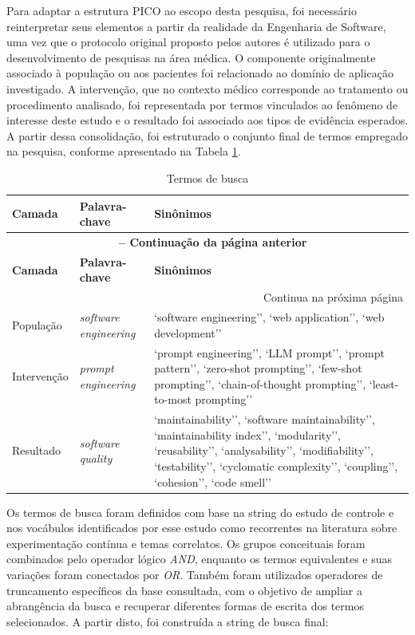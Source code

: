 Para adaptar a estrutura PICO ao escopo desta pesquisa, foi necessário reinterpretar seus elementos a partir da realidade da Engenharia de Software, uma vez que o protocolo original proposto pelos autores é utilizado para o desenvolvimento de pesquisas na área médica. O componente originalmente associado à população ou aos pacientes foi relacionado ao domínio de aplicação investigado. A intervenção, que no contexto médico corresponde ao tratamento ou procedimento analisado, foi representada por termos vinculados ao fenômeno de interesse deste estudo e o resultado foi associado aos tipos de evidência esperados. A partir dessa consolidação, foi estruturado o conjunto final de termos empregado na pesquisa, conforme apresentado na Tabela \ref{tab:termos_busca}.

\begin{longtable}{|p{3cm}|p{4cm}|p{8cm}|}
\caption{Termos de busca} \label{tab:termos_busca} \\
\hline
\textbf{Camada} & \textbf{Palavra-chave} & \textbf{Sinônimos} \\
\hline
\endfirsthead
\multicolumn{3}{c}{{\bfseries \tablename\ \thetable{} -- Continuação da página anterior}} \\ \hline
\textbf{Camada} & \textbf{Palavra-chave} & \textbf{Sinônimos} \\
\hline
\endhead
\hline \multicolumn{3}{r}{{Continua na próxima página}} \\
\endfoot
\hline
\endlastfoot
População & \textit{software engineering} &
`software engineering'', `web application'', `web development'' \\
        \hline
        Intervenção & \textit{prompt engineering} & 
        `prompt engineering'', `LLM prompt'', `prompt pattern'', `zero-shot prompting'', `few-shot prompting'', `chain-of-thought prompting'', `least-to-most prompting'' \\
\hline
Resultado & \textit{software quality} &
`maintainability'', `software maintainability'', `maintainability index'', `modularity'', `reusability'', `analysability'', `modifiability'', `testability'', `cyclomatic complexity'', `coupling'', `cohesion'', `code smell'' \\
\end{longtable}

Os termos de busca foram definidos com base na string do estudo de controle e nos vocábulos identificados por esse estudo como recorrentes na literatura sobre experimentação contínua e temas correlatos. Os grupos conceituais foram combinados pelo operador lógico \textit{AND}, enquanto os termos equivalentes e suas variações foram conectados por \textit{OR}. Também foram utilizados operadores de truncamento específicos da base consultada, com o objetivo de ampliar a abrangência da busca e recuperar diferentes formas de escrita dos termos selecionados. A partir disto, foi construída a string de busca final:

